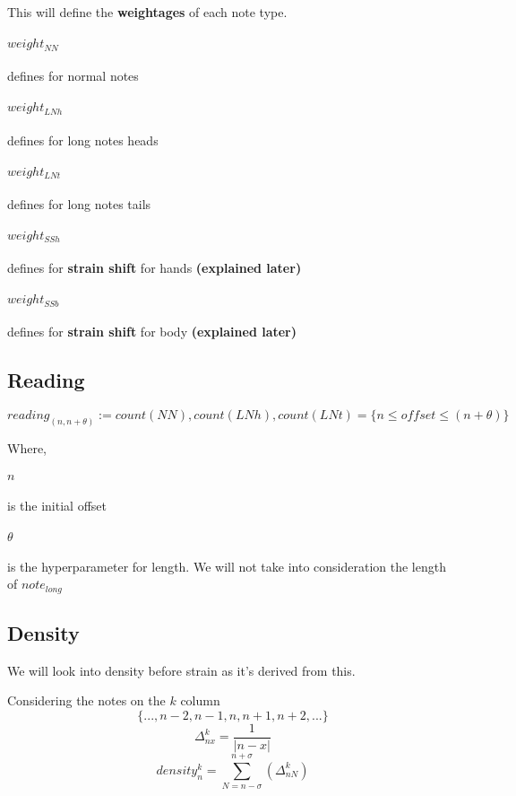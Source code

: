 This will define the \textbf{weightages} of each note type.
\paragraph{$weight_{NN}$} defines for normal notes
\paragraph{$weight_{LNh}$} defines for long notes heads
\paragraph{$weight_{LNt}$} defines for long notes tails
\paragraph{$weight_{SSh}$} defines for \textbf{strain shift} for hands \textbf{(explained later)}
\paragraph{$weight_{SSb}$} defines for \textbf{strain shift} for body \textbf{(explained later)}

\subsection{Reading}

$$ reading_{(n,n+\theta)} := 
count(NN), count(LNh), count(LNt)
= \lbrace n \leq offset \leq (n+ \theta) \rbrace$$

Where,

\paragraph{$n$} is the initial offset
\paragraph{$\theta$} is the hyperparameter for length.
We will not take into consideration the length of $note_{long}$

\subsection{Density}

We will look into density before strain as it's derived from this.

Considering the notes on the $k$ column
$$ \lbrace ..., n-2, n-1, n, n+1, n+2, ... \rbrace $$
$$ \Delta_{nx}^k = \frac{1}{|n - x|}$$
$$ density_n^k =
\sum_{N=n-\sigma}^{n+\sigma}
\left(
\Delta_{nN}^k
\right)$$

